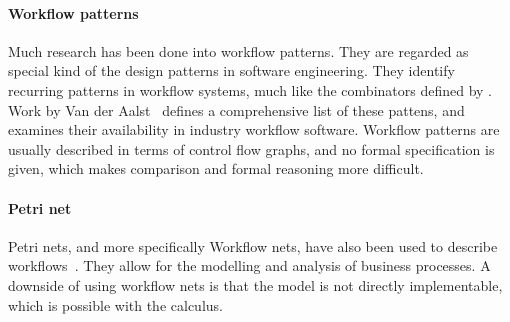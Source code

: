 \paragraph{Workflow patterns}

Much research has been done into workflow patterns. They are regarded as special
kind of the design patterns in software engineering. They identify recurring patterns
in workflow systems, much like the combinators defined by \TOPHAT. Work by
Van der Aalst~\cite{journals/dpd/AalstHKB03} defines a comprehensive list of
these pattens, and examines their availability in industry workflow software.
Workflow patterns are usually described in terms of control flow graphs, and no
formal specification is given, which makes comparison and formal reasoning more
difficult.

\paragraph{Petri net}

Petri nets, and more specifically Workflow nets, have also been used to describe
workflows~\cite{journals/jcsc/Aalst98}. They allow for the modelling and
analysis of business processes. A downside of using workflow nets is that the
model is not directly implementable, which is possible with the \TOPHAT calculus.
